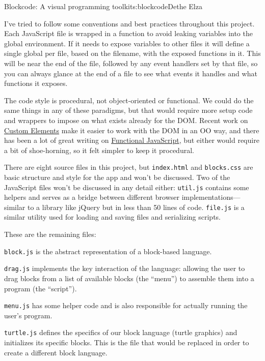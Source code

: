 \begin{aosachapter}{Blockcode: A visual programming toolkit}{s:blockcode}{Dethe Elza}
\label{stepping-through-the-code}

I've tried to follow some conventions and best practices throughout this
project. Each JavaScript file is wrapped in a function to avoid leaking
variables into the global environment. If it needs to expose variables
to other files it will define a single global per file, based on the
filename, with the exposed functions in it. This will be near the end of
the file, followed by any event handlers set by that file, so you can
always glance at the end of a file to see what events it handles and
what functions it exposes.

The code style is procedural, not object-oriented or functional. We
could do the same things in any of these paradigms, but that would
require more setup code and wrappers to impose on what exists already
for the DOM. Recent work on \href{http://webcomponents.org/}{Custom
Elements} make it easier to work with the DOM in an OO way, and there
has been a lot of great writing on
\href{https://leanpub.com/javascript-allonge/read}{Functional
JavaScript}, but either would require a bit of shoe-horning, so it felt
simpler to keep it procedural.

There are eight source files in this project, but \texttt{index.html}
and \texttt{blocks.css} are basic structure and style for the app and
won't be discussed. Two of the JavaScript files won't be discussed in
any detail either: \texttt{util.js} contains some helpers and serves as
a bridge between different browser implementations---similar to a
library like jQuery but in less than 50 lines of code. \texttt{file.js}
is a similar utility used for loading and saving files and serializing
scripts.

These are the remaining files:

\begin{aosaitemize}

\item
  \texttt{block.js} is the abstract representation of a block-based
  language.
\item
  \texttt{drag.js} implements the key interaction of the language:
  allowing the user to drag blocks from a list of available blocks (the
  ``menu'') to assemble them into a program (the ``script'').
\item
  \texttt{menu.js} has some helper code and is also responsible for
  actually running the user's program.
\item
  \texttt{turtle.js} defines the specifics of our block language (turtle
  graphics) and initializes its specific blocks. This is the file that
  would be replaced in order to create a different block language.
\end{aosaitemize}


\end{aosachapter}
